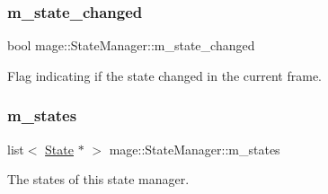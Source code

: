 \subsubsection{\texorpdfstring{m\+\_\+state\+\_\+changed}{m\_state\_changed}}
{\footnotesize\ttfamily bool mage\+::\+State\+Manager\+::m\+\_\+state\+\_\+changed\hspace{0.3cm}{\ttfamily [private]}}

Flag indicating if the state changed in the current frame. \hypertarget{classmage_1_1_state_manager_a2181432805f365bfb8ccff0f959d2121}{}\label{classmage_1_1_state_manager_a2181432805f365bfb8ccff0f959d2121} 
\subsubsection{\texorpdfstring{m\+\_\+states}{m\_states}}
{\footnotesize\ttfamily list$<$ \hyperlink{classmage_1_1_state}{State} $\ast$ $>$ mage\+::\+State\+Manager\+::m\+\_\+states\hspace{0.3cm}{\ttfamily [private]}}

The states of this state manager. 